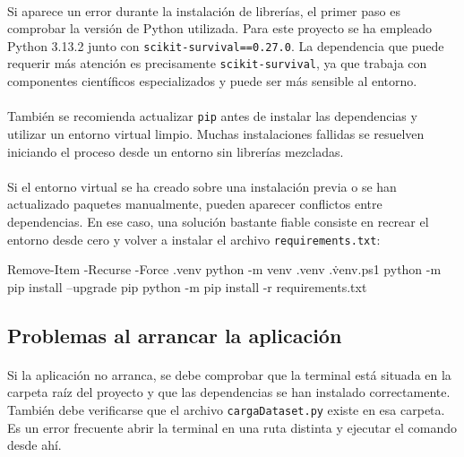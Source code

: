 \paragraph*{}Si aparece un error durante la instalación de librerías, el primer paso es comprobar la versión de Python utilizada. Para este proyecto se ha empleado Python 3.13.2 junto con \texttt{scikit-survival==0.27.0}. La dependencia que puede requerir más atención es precisamente \texttt{scikit-survival}, ya que trabaja con componentes científicos especializados y puede ser más sensible al entorno.

\paragraph*{}También se recomienda actualizar \texttt{pip} antes de instalar las dependencias y utilizar un entorno virtual limpio. Muchas instalaciones fallidas se resuelven iniciando el proceso desde un entorno sin librerías mezcladas.

\paragraph*{}Si el entorno virtual se ha creado sobre una instalación previa o se han actualizado paquetes manualmente, pueden aparecer conflictos entre dependencias. En ese caso, una solución bastante fiable consiste en recrear el entorno desde cero y volver a instalar el archivo \texttt{requirements.txt}:

\begin{bloquecomando}
Remove-Item -Recurse -Force .venv
python -m venv .venv
.\.venv\Scripts\Activate.ps1
python -m pip install --upgrade pip
python -m pip install -r requirements.txt
\end{bloquecomando}

\subsection{Problemas al arrancar la aplicación}

\paragraph*{}Si la aplicación no arranca, se debe comprobar que la terminal está situada en la carpeta raíz del proyecto y que las dependencias se han instalado correctamente. También debe verificarse que el archivo \texttt{cargaDataset.py} existe en esa carpeta. Es un error frecuente abrir la terminal en una ruta distinta y ejecutar el comando desde ahí.

